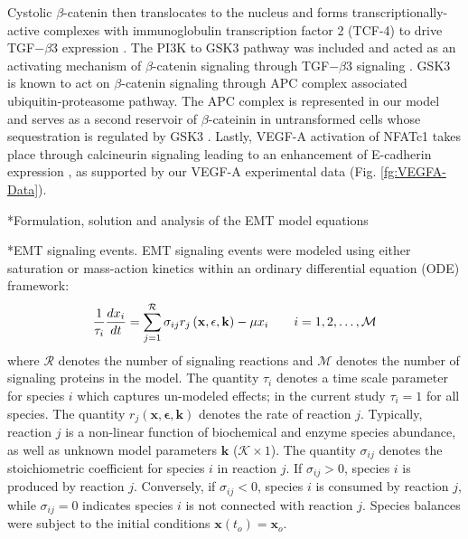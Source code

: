 \documentclass[12pt]{article}
\makeatletter
\renewcommand\subsection{\@startsection
	{subsection}{2}{0mm}
	{-0.05in}
	{-0.5\baselineskip}
	{\normalfont\normalsize\bfseries}}
\renewcommand\subsubsection{\@startsection
	{subsubsection}{2}{0mm}
	{-0.05in}
	{-0.5\baselineskip}
	{\normalfont\normalsize\itshape}}
\makeatother
\begin{document}
Cystolic $\beta$-catenin then translocates to the nucleus and forms transcriptionally-active complexes with immunoglobulin transcription factor 2 (TCF-4)
to drive TGF$-\beta$3 expression \citep{Medici:2008fk}. The PI3K to GSK3 pathway was included and acted as an activating mechanism of $\beta$-catenin signaling through TGF$-\beta$3 signaling \citep{Medici:2008fk}. GSK3 is known to act on $\beta$-catenin signaling through APC complex associated ubiquitin-proteasome pathway. The APC complex is represented in our model and serves as a second reservoir  of $\beta$-cateinin in untransformed cells whose sequestration is regulated by GSK3 \citep{Zhou:2004kx,Larue:2005vn,Medici:2008fk}. Lastly, VEGF-A activation of NFATc1 takes place through calcineurin signaling leading to an enhancement of E-cadherin expression \citep{Suehiro:2014aa},
as supported by our VEGF-A experimental data (Fig. \ref{fg:VEGFA-Data}).


\subsection*{Formulation, solution and analysis of the EMT model equations}
\subsubsection*{EMT signaling events.}
EMT signaling events were modeled using either saturation or mass-action kinetics within an ordinary differential equation (ODE) framework:
\begin{equation}
	\frac{1}{\tau_{i}}\frac{dx_{i}}{dt}  =  \sum_{j = 1}^{\mathcal{R}}\sigma_{ij}r_{j}\left(\mathbf{x},\mathbf{\epsilon},\mathbf{k}\right)-\mu x_{i}\qquad{i=1,2,\hdots,\mathcal{M}}\\
\end{equation}
where $\mathcal{R}$ denotes the number of signaling reactions and $\mathcal{M}$ denotes the number of signaling proteins in the model.
The quantity $\tau_{i}$ denotes a time scale parameter for species $i$ which captures un-modeled effects; in the current study $\tau_{i} = 1$ for all species.
The quantity $r_{j}\left(\mathbf{x},\mathbf{\epsilon},\mathbf{k}\right)$ denotes the rate of reaction $j$.
Typically, reaction $j$ is a non-linear function of biochemical and enzyme species abundance, as well as unknown model parameters $\mathbf{k}$ ($\mathcal{K}\times{1}$).
The quantity $\sigma_{ij}$ denotes the stoichiometric coefficient for species $i$ in reaction $j$.
If $\sigma_{ij}>0$, species $i$ is produced by reaction $j$.
Conversely, if $\sigma_{ij}<0$, species $i$ is consumed by reaction $j$, while $\sigma_{ij} = 0$ indicates species $i$ is not connected with reaction $j$.
Species balances were subject to the initial conditions $\mathbf{x}\left(t_{o}\right) = \mathbf{x}_{o}$.
\end{document}
